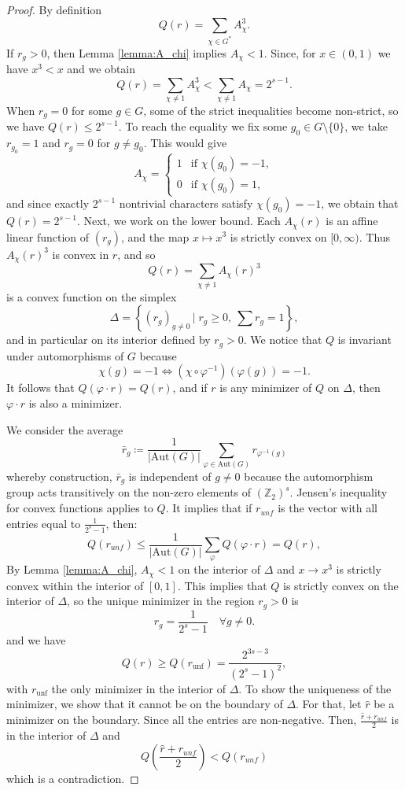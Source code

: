 \documentclass[12pt,twoside,]{amsart}
\theoremstyle{plain}
\theoremstyle{definition}
\begin{document}
\begin{proof}
By definition
\[
Q(r) = \sum_{\chi \in G^* } A_\chi^3.
\]
If $r_g >0$, then Lemma \ref{lemma:A_chi}
implies $A_\chi< 1$. Since, for $x \in (0,1)$ we have $x^3 < x$ and we obtain
\[
Q(r)
= \sum_{\chi \neq 1} A_\chi^3
< \sum_{\chi \neq 1} A_\chi
= 2^{s-1}.
\]
When $r_g = 0$ for some $g \in G$, some of the strict inequalities become non-strict, so we have
$Q(r) \leq 2^{s-1}$. To reach the equality 
 we fix some $g_0 \in G\setminus\{0\}$, we take $r_{g_0}=1$ and $r_g=0$ for $g\neq g_0$. This would give
\[
A_\chi =
\begin{cases}
1 & \text{if } \chi(g_0) = -1,\\
0 & \text{if } \chi(g_0) = 1,
\end{cases}
\]
and since exactly $2^{s-1}$ nontrivial characters satisfy $\chi(g_0)=-1$, we obtain that 
\(
Q(r) = 2^{s-1}.
\)
Next, we work on the lower bound.  Each $A_\chi(r)$ is an affine linear function of $(r_g)$, and
the map $x \mapsto x^3$ is strictly convex on $[0,\infty)$.
Thus $A_\chi(r)^3$ is convex in $r$, and so
\[
Q(r)
= \sum_{\chi \neq 1} A_\chi(r)^3
\]
is a convex function on the simplex
\[
\Delta = \left\{ (r_g)_{g\neq 0} \, | \;  r_g \ge 0,\ \sum r_g = 1 \right\},
\]
and in particular on its interior defined by $r_g > 0$. We notice that $Q$ is invariant under automorphisms of $G$ because 
\[
\chi(g) = -1 \iff 
\left( \chi \circ \varphi^{-1} \right) (\varphi(g)) =-1.
\]
It follows that $Q(\varphi \cdot r) = Q(r)$, and if
$r$ is any minimizer of $Q$ on $\Delta$, then $\varphi\cdot r$ is also a minimizer. 


We consider the average
\[
\bar r_g \coloneqq \frac{1}{|\mathrm{Aut}(G)|}
\sum_{\varphi \in \mathrm{Aut}(G)} 
r_{\varphi^{-1}(g)} 
\]
whereby construction, $\bar r_g$ is independent of $g\neq 0$ because the automorphism group acts transitively on the non-zero elements of $(\mathbb{Z}_2)^s$. 
 Jensen's inequality for convex functions applies to $Q$. It implies that if $r_{unf}$ is the vector with all entries
 equal to $\frac{1}{2^s-1}$, then:
\[
Q(r_{unf})
\le \frac{1}{|\mathrm{Aut}(G)|}
\sum_{\varphi} Q(\varphi \cdot r )
= Q(r),
\]
By Lemma \ref{lemma:A_chi}, $A_\chi <1$ on the interior of $\Delta$ and $x \to x^3$ is strictly convex within the interior of $[0,1]$. This implies that $Q$ is strictly convex on the interior of $\Delta$, so the unique minimizer in the
region $r_g>0$ is
\[
r_g = \frac{1}{2^s-1}\quad \forall g\neq 0.
\]
and we have
\[
Q(r) \ge Q(r_{\mathrm{unf}})
= \frac{2^{3s-3}}{(2^s - 1)^2},
\]
with $r_{\mathrm{unf}}$ the only minimizer in the interior of $\Delta$.
To show the uniqueness of the minimizer, we show that it cannot be on the boundary of $\Delta$. For that, let $\hat{r}$ be a minimizer on the boundary. Since all the entries are non-negative. Then, 
$\frac{\hat{r}+r_{unf}}{2}$ is in the interior of $\Delta$ and 
\[
Q\left( 
\frac{\hat{r}+r_{unf}}{2}
\right)
<
Q(r_{unf})
\]
which is a contradiction.
\end{proof}
\end{document}
